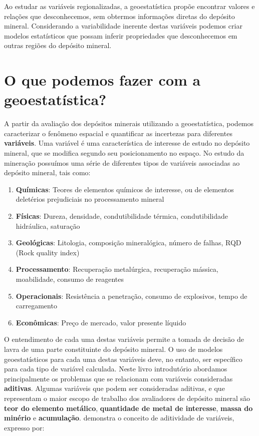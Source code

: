  Ao estudar as variáveis regionalizadas, a  geoestatística propõe encontrar valores e relações que desconhecemos, sem obtermos informações diretas do depósito mineral. Considerando a variabilidade inerente destas variáveis podemos criar modelos estatísticos que possam inferir propriedades que desconhecemos em outras regiões do depósito mineral.
  

 \section{O que podemos fazer com a geoestatística?}
 
 A partir da avaliação dos depósitos minerais utilizando a geoestatística, podemos caracterizar o fenômeno espacial e quantificar as incertezas para diferentes \textbf{variáveis}. Uma variável é uma característica  de interesse de estudo no depósito mineral, que se modifica segundo seu posicionamento no espaço. No estudo da mineração possuímos uma série de diferentes tipos de variáveis associadas ao depósito mineral, tais como:
 
 \begin{enumerate}
 	\item \textbf{Químicas}: Teores de elementos químicos de interesse, ou de elementos deletérios prejudiciais no processamento mineral
 	\item \textbf{Físicas}: Dureza, densidade, condutibilidade térmica, condutibilidade hidráulica, saturação
 	\item \textbf{Geológicas}: Litologia, composição mineralógica, número de falhas, RQD (Rock quality index)
 	\item \textbf{Processamento}: Recuperação metalúrgica, recuperação mássica, moabilidade, consumo de reagentes
 	\item \textbf{Operacionais}: Resistência a penetração, consumo de explosivos, tempo de carregamento 
 	\item \textbf{Econômicas}: Preço de mercado, valor presente líquido
 \end{enumerate} 

O entendimento de cada uma destas variáveis permite a tomada de decisão de lavra de uma parte constituinte do depósito mineral. O uso de modelos geoestatísticos para cada uma destas variáveis deve, no entanto, ser específico para cada tipo de variável calculada. Neste livro introdutório abordamos principalmente os problemas que se relacionam com variáveis consideradas \textbf{aditivas}. Algumas variáveis que podem ser consideradas aditivas, e que representam o maior escopo de trabalho dos avaliadores de depósito mineral são \textbf{teor do elemento metálico}, \textbf{quantidade de metal de interesse}, \textbf{massa do minério} e \textbf{acumulação}. \citet{carrasco2008additivity} demonstra o conceito de aditividade de variáveis, expresso por: 


